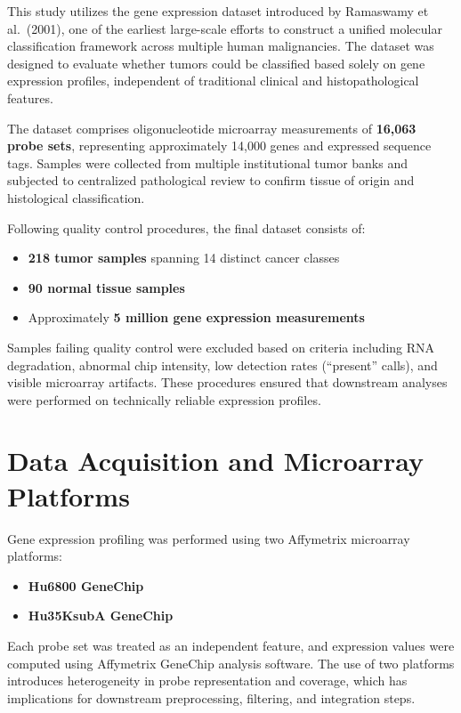 \documentclass[
  letterpaper,
  DIV=11,
  numbers=noendperiod,
  openany,
  oneside]{scrreprt}
\providecommand{\tightlist}{%
  \setlength{\itemsep}{0pt}\setlength{\parskip}{0pt}}
\begin{document}
This study utilizes the gene expression dataset introduced by Ramaswamy
et al.~(2001), one of the earliest large-scale efforts to construct a
unified molecular classification framework across multiple human
malignancies. The dataset was designed to evaluate whether tumors could
be classified based solely on gene expression profiles, independent of
traditional clinical and histopathological features.

The dataset comprises oligonucleotide microarray measurements of
\textbf{16,063 probe sets}, representing approximately 14,000 genes and
expressed sequence tags. Samples were collected from multiple
institutional tumor banks and subjected to centralized pathological
review to confirm tissue of origin and histological classification.

Following quality control procedures, the final dataset consists of:

\begin{itemize}
\tightlist
\item
  \textbf{218 tumor samples} spanning 14 distinct cancer classes\\
\item
  \textbf{90 normal tissue samples}\\
\item
  Approximately \textbf{5 million gene expression measurements}
\end{itemize}

Samples failing quality control were excluded based on criteria
including RNA degradation, abnormal chip intensity, low detection rates
(``present'' calls), and visible microarray artifacts. These procedures
ensured that downstream analyses were performed on technically reliable
expression profiles.

\section{Data Acquisition and Microarray
Platforms}\label{data-acquisition-and-microarray-platforms}

Gene expression profiling was performed using two Affymetrix microarray
platforms:

\begin{itemize}
\tightlist
\item
  \textbf{Hu6800 GeneChip}
\item
  \textbf{Hu35KsubA GeneChip}
\end{itemize}

Each probe set was treated as an independent feature, and expression
values were computed using Affymetrix GeneChip analysis software. The
use of two platforms introduces heterogeneity in probe representation
and coverage, which has implications for downstream preprocessing,
filtering, and integration steps.
\end{document}

